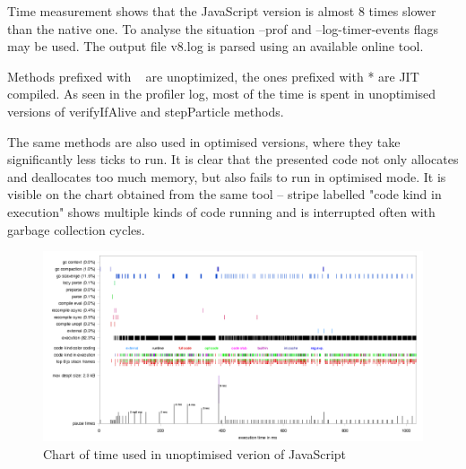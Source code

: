 


Time measurement shows that the JavaScript version is almost 8 times slower than the native one. To analyse the situation --prof and --log-timer-events flags may be used. The output file v8.log is parsed using an available online tool.\cite{v8-profile-plotter}



Methods prefixed with ~ are unoptimized, the ones prefixed with * are JIT compiled. As seen in the profiler log, most of the time is spent in unoptimised versions of verifyIfAlive and stepParticle methods.



The same methods are also used in optimised versions, where they take significantly less ticks to run. It is clear that the presented code not only allocates and deallocates too much memory, but also fails to run in optimised mode. It is visible on the chart obtained from the same tool -- stripe labelled "code kind in execution" shows multiple kinds of code running and is interrupted often with garbage collection cycles.

\begin{figure}[h!]
  \caption{Chart of time used in unoptimised verion of JavaScript}
  \label{img:particles1profile}
  \centering
	\includegraphics[width=16cm]{particles/particles1-profile.png}
\end{figure}

